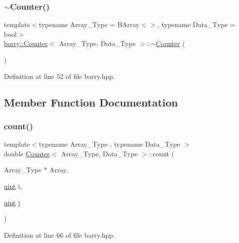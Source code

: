 \subsubsection{\texorpdfstring{$\sim$\+Counter()}{~Counter()}}
{\footnotesize\ttfamily template$<$typename Array\+\_\+\+Type  = B\+Array$<$$>$, typename Data\+\_\+\+Type  = bool$>$ \\
\hyperlink{classbarry_1_1_counter}{barry\+::\+Counter}$<$ Array\+\_\+\+Type, Data\+\_\+\+Type $>$\+::$\sim$\hyperlink{classbarry_1_1_counter}{Counter} (\begin{DoxyParamCaption}{ }\end{DoxyParamCaption})\hspace{0.3cm}{\ttfamily [inline]}}



Definition at line 52 of file barry.\+hpp.



\subsection{Member Function Documentation}
\mbox{\label{classbarry_1_1_counter_afe1d23e72c3bdca9b2481f36ebde1d95}} 
\subsubsection{\texorpdfstring{count()}{count()}}
{\footnotesize\ttfamily template$<$typename Array\+\_\+\+Type , typename Data\+\_\+\+Type $>$ \\
double \hyperlink{classbarry_1_1_counter}{Counter}$<$ Array\+\_\+\+Type, Data\+\_\+\+Type $>$\+::count (\begin{DoxyParamCaption}\item[{Array\+\_\+\+Type $\ast$}]{Array,  }\item[{\hyperlink{namespacebarry_a11dfc53ddb4672278319aa04f1e09a6c}{uint}}]{i,  }\item[{\hyperlink{namespacebarry_a11dfc53ddb4672278319aa04f1e09a6c}{uint}}]{j }\end{DoxyParamCaption})\hspace{0.3cm}{\ttfamily [inline]}}



Definition at line 66 of file barry.\+hpp.

\mbox{\label{classbarry_1_1_counter_ae0451979ddc51a5fbf00de78c37d3216}} 
